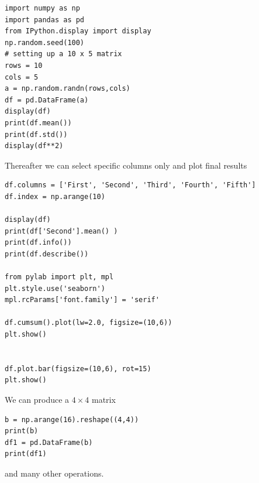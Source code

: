 \documentclass{beamer}
\begin{document}
\begin{frame}
\begin{verbatim}
import numpy as np
import pandas as pd
from IPython.display import display
np.random.seed(100)
# setting up a 10 x 5 matrix
rows = 10
cols = 5
a = np.random.randn(rows,cols)
df = pd.DataFrame(a)
display(df)
print(df.mean())
print(df.std())
display(df**2)

\end{verbatim}


Thereafter we can select specific columns only and plot final results



















\begin{verbatim}
df.columns = ['First', 'Second', 'Third', 'Fourth', 'Fifth']
df.index = np.arange(10)

display(df)
print(df['Second'].mean() )
print(df.info())
print(df.describe())

from pylab import plt, mpl
plt.style.use('seaborn')
mpl.rcParams['font.family'] = 'serif'

df.cumsum().plot(lw=2.0, figsize=(10,6))
plt.show()


df.plot.bar(figsize=(10,6), rot=15)
plt.show()

\end{verbatim}

We can produce a $4\times 4$ matrix





\begin{verbatim}
b = np.arange(16).reshape((4,4))
print(b)
df1 = pd.DataFrame(b)
print(df1)

\end{verbatim}

and many other operations. 


\end{frame}
\end{document}
